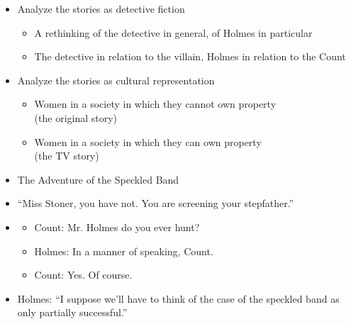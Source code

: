 \documentclass[a4paper,landscape,headrule,footrule,xetex]{foils}
\begin{document}
% 

\begin{itemize}
\item Analyze the stories as detective fiction
  \begin{itemize}
  \item A rethinking of the detective in general, of Holmes
in particular
\item The detective in relation to the villain, Holmes in
relation to the Count
\end{itemize}
\item Analyze the stories as cultural representation
  \begin{itemize}
  \item Women in a society in which they cannot own
property \\ (the original story)
\item Women in a society in which they can own
property \\ (the TV story)
\end{itemize}


\end{itemize}


\begin{itemize}
\item The Adventure of the Speckled Band
\item “Miss Stoner, you have not. You are screening your
stepfather.”
\item 
  \begin{itemize}
  \item Count: Mr. Holmes do you ever hunt?
  \item Holmes: In a manner of speaking, Count.
  \item Count: Yes. Of course.
  \end{itemize}
\item Holmes: “I suppose we’ll have to think of the case
of the speckled band as only partially successful.”
\end{itemize}
\end{document}
